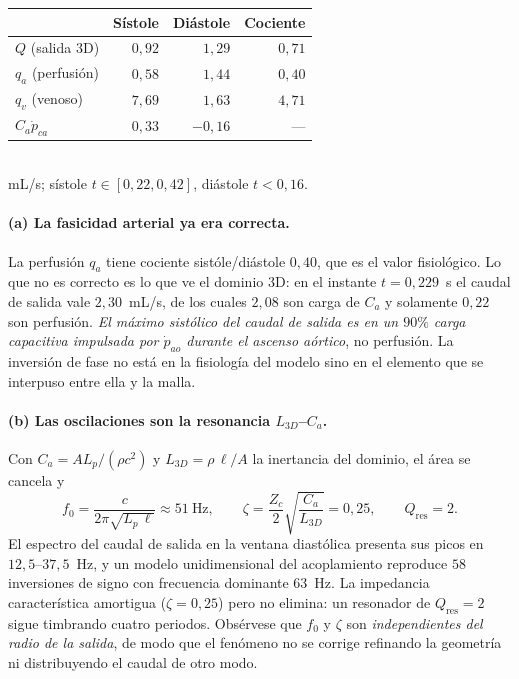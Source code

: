 \documentclass[11pt]{article}
\begin{document}
\begin{center}\small
\begin{tabular}{lrrr}
\toprule
 & S\'istole & Di\'astole & Cociente\\
\midrule
$Q$ (salida 3D)              & $0{,}92$ & $1{,}29$ & $0{,}71$\\
$q_a$ (perfusi\'on)          & $0{,}58$ & $1{,}44$ & $0{,}40$\\
$q_v$ (venoso)               & $7{,}69$ & $1{,}63$ & $4{,}71$\\
$C_a\dot p_{ca}$             & $0{,}33$ & $-0{,}16$ & ---\\
\bottomrule
\end{tabular}\\[2pt]
\footnotesize mL/s; s\'istole $t\in[0{,}22,0{,}42]$, di\'astole $t<0{,}16$.
\end{center}

\paragraph{(a) La fasicidad arterial ya era correcta.} La perfusi\'on $q_a$
tiene cociente sist\'ole/di\'astole $0{,}40$, que es el valor fisiol\'ogico. Lo
que no es correcto es lo que ve el dominio 3D: en el instante $t=0{,}229$~s el
caudal de salida vale $2{,}30$~mL/s, de los cuales $2{,}08$ son carga de $C_a$ y
solamente $0{,}22$ son perfusi\'on. \emph{El m\'aximo sist\'olico del caudal de
salida es en un $90\%$ carga capacitiva impulsada por $\dot p_{ao}$ durante el
ascenso a\'ortico}, no perfusi\'on. La inversi\'on de fase no est\'a en la
fisiolog\'ia del modelo sino en el elemento que se interpuso entre ella y la
malla.

\paragraph{(b) Las oscilaciones son la resonancia $L_{3D}$--$C_a$.} Con
$C_a=A L_p/(\rho c^2)$ y $L_{3D}=\rho\,\ell/A$ la inertancia del dominio, el
\'area se cancela y
\begin{equation}
  f_0=\frac{c}{2\pi\sqrt{L_p\,\ell}}\approx51\ \text{Hz},
  \qquad
  \zeta=\frac{Z_c}{2}\sqrt{\frac{C_a}{L_{3D}}}=0{,}25,
  \qquad
  Q_{\text{res}}=2 .
  \label{eq:res}
\end{equation}
El espectro del caudal de salida en la ventana diast\'olica presenta sus picos
en $12{,}5$--$37{,}5$~Hz, y un modelo unidimensional del acoplamiento reproduce
$58$ inversiones de signo con frecuencia dominante $63$~Hz. La impedancia
caracter\'istica amortigua ($\zeta=0{,}25$) pero no elimina: un resonador de
$Q_{\text{res}}=2$ sigue timbrando cuatro periodos. Obs\'ervese que $f_0$ y
$\zeta$ son \emph{independientes del radio de la salida}, de modo que el
fen\'omeno no se corrige refinando la geometr\'ia ni distribuyendo el caudal de
otro modo.
\end{document}
